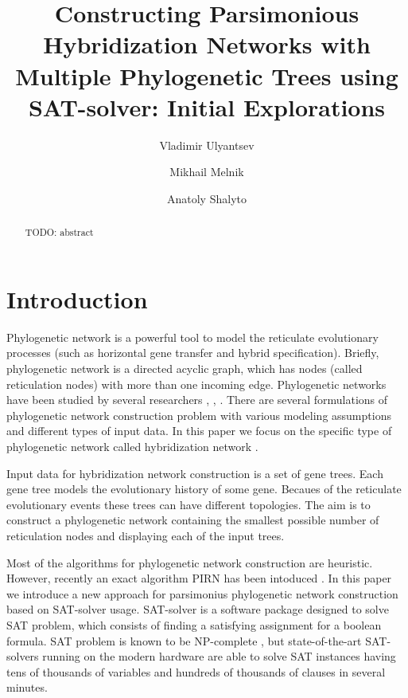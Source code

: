 \documentclass[runningheads, envcountsame, a4paper]{llncs}
\begin{document}
\mainmatter           
\title{Constructing Parsimonious Hybridization Networks with Multiple Phylogenetic Trees using SAT-solver: Initial Explorations}
\titlerunning{ } 
\toctitle{ }

\author{Vladimir Ulyantsev \and Mikhail Melnik \and Anatoly Shalyto}
%

\maketitle
\setcounter{footnote}{0}

\begin{abstract}
  TODO: abstract

\end{abstract}

\section{Introduction}

Phylogenetic network is a powerful tool to model the reticulate
evolutionary processes (such as horizontal gene transfer and hybrid specification).
Briefly, phylogenetic network is a directed acyclic graph, which has
nodes (called reticulation nodes) with more than one incoming edge. Phylogenetic
networks have been studied by several researchers \cite{huson}, \cite{morrison}, 
\cite{nakhleh}. There are several formulations of phylogenetic network
construction problem with various modeling assumptions and different types of input data. 
In this paper we focus on the specific type of phylogenetic network called hybridization
network \cite{semple}.

Input data for hybridization network construction is a set of gene trees. Each gene tree
models the evolutionary history of some gene. Becaues of the reticulate evolutionary events
these trees can have different topologies. The aim is to construct a phylogenetic network
containing the smallest possible number of reticulation nodes and displaying each of the input trees. 

Most of the algorithms for phylogenetic network construction are heuristic. However, recently
an exact algorithm PIRN has been intoduced \cite{wu}. In this paper we introduce a new approach for parsimonius
phylogenetic network construction based on SAT-solver usage. SAT-solver is a software package designed
to solve SAT problem, which consists of finding a satisfying assignment for a boolean formula. 
SAT problem is known to be NP-complete \cite{}, but state-of-the-art SAT-solvers running on the modern hardware 
are able to solve SAT instances having tens of thousands of variables and hundreds of thousands of clauses in several minutes.
\end{document}
